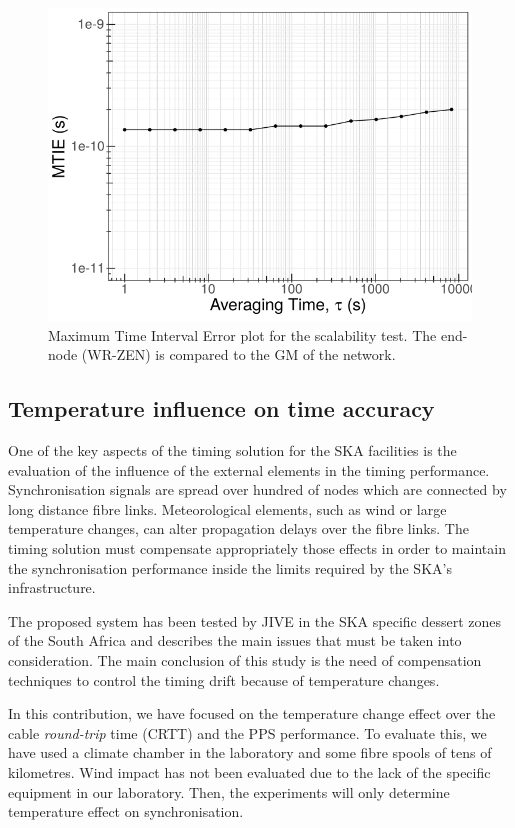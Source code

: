 \begin{figure}
	\centering
	\includegraphics[width=0.7\linewidth]{img/mtie_exp3}
	\caption[MTIE of the end-nodes in the scalability test.]{Maximum Time 
	Interval Error plot for the scalability test. The end-node (WR-ZEN) is compared to the GM of the network.}
	\label{fig:mtienet}
\end{figure}

\subsection{Temperature influence on time accuracy}
\label{subsec:temp}

One of the key aspects of the timing solution for the SKA facilities is the 
evaluation of the influence of the external elements in the timing performance. 
Synchronisation signals are spread over hundred of nodes which are connected by 
long distance fibre links. Meteorological elements, such as wind or large 
temperature changes, can alter propagation delays over the fibre 
links. The timing solution must compensate appropriately those effects in order 
to maintain the synchronisation performance inside the limits required by the 
SKA's infrastructure. 

The proposed system has been tested by JIVE \cite{jive:website} in the SKA specific dessert zones of 
the South Africa and \cite{paul-boven-paper-icalepcs} describes the main issues 
that must be taken into consideration. The main conclusion of this study is the
need of compensation techniques to control the timing drift because of
temperature changes.

In this contribution, we have focused on the temperature change effect over the 
cable \textit{round-trip} time (CRTT) and the PPS performance. To evaluate this, we have used a climate chamber in the laboratory and some fibre spools of tens of kilometres. Wind impact has not been evaluated due to the lack of the specific equipment in our laboratory. Then, the experiments will only determine temperature effect on synchronisation.

